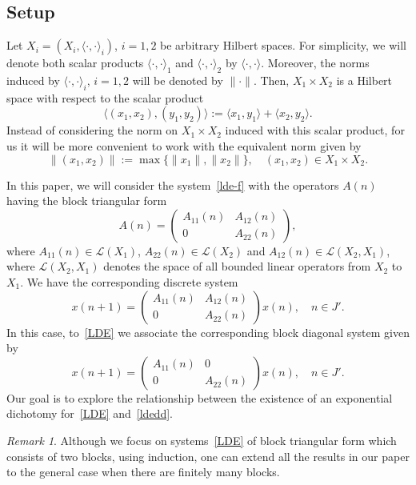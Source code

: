 \documentclass[11pt,reqno,a4paper]{amsart}
\theoremstyle{plain}
\numberwithin{equation}{section}
\theoremstyle{remark}
\newtheorem{remark}{Remark}
\begin{document}
\subsection{Setup}
Let $X_i=(X_i, \langle \cdot, \cdot\rangle_i)$, $i=1, 2$ be arbitrary Hilbert spaces. For simplicity, we will denote both scalar products $\langle \cdot, \cdot\rangle_1$ and $\langle \cdot, \cdot\rangle_2$ by $\langle \cdot, \cdot \rangle$. Moreover, the norms induced by $\langle \cdot, \cdot \rangle_i$, $i=1, 2$ will be denoted by $\| \cdot \|$.
Then, $X_1\times X_2$ is a Hilbert space with respect to the scalar product
\[
\langle (x_1, x_2), (y_1, y_2)\rangle:=\langle x_1, y_1\rangle+\langle x_2, y_2\rangle.
\]
Instead of considering the norm on $X_1\times X_2$ induced with this scalar product, for us it will be more convenient to work with the equivalent norm given by 
\[
\|(x_1, x_2)\|:=\max \{\|x_1\|, \|x_2\|\}, \quad (x_1, x_2)\in X_1\times X_2.
\]

In this paper, we will consider the system~\eqref{lde-f} with the operators $A(n)$ having the block triangular form
\begin{equation}\label{tf} A (n) =\begin{pmatrix}
A_{11}(n) & A_{12}(n)\\
0 & A_{22}(n)
\end{pmatrix},
\end{equation}
where $A_{11}(n)\in \mathcal L(X_1)$, $A_{22}(n)\in \mathcal L(X_2)$ and $A_{12}(n)\in \mathcal L(X_2, X_1)$, where $\mathcal L(X_2, X_1)$ denotes the space of all bounded linear operators from $X_2$ to $X_1$. We have the corresponding discrete system
\begin{equation}\label{LDE}
x(n+1)=\begin{pmatrix}
A_{11}(n) & A_{12}(n)\\
0 & A_{22}(n)
\end{pmatrix} x(n), \quad n\in J'.
\end{equation}
In this case, to~\eqref{LDE} we associate the corresponding block diagonal system given by 
\begin{equation}\label{ldedd}
    x(n+1)=\begin{pmatrix}
A_{11}(n) & 0\\
0 & A_{22}(n)
    \end{pmatrix} x(n), \quad n\in J'.
\end{equation}
Our goal is to explore the relationship between the existence of an exponential dichotomy for~\eqref{LDE} and~\eqref{ldedd}.
\begin{remark}
Although we focus on systems~\eqref{LDE} of block triangular form which consists of two blocks, using induction, one can extend all the results in our paper to the general case when there are finitely many blocks. 
\end{remark}
\end{document}
